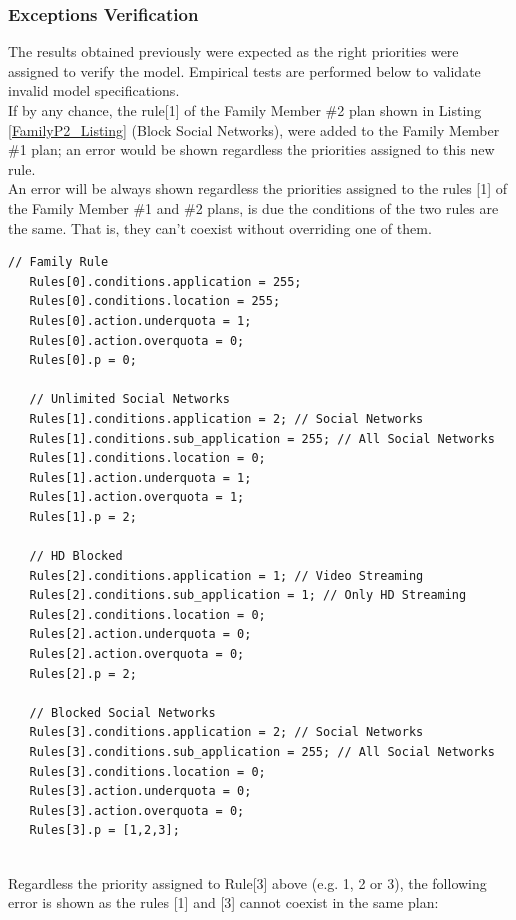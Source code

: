 \subsubsection{Exceptions Verification}
\label{sec:mutualExclusion}
\noindent The results obtained previously were expected as the right priorities were assigned to verify the model. Empirical tests are performed below to validate invalid model specifications. \\

If by any chance, the rule[1] of the Family Member \#2 plan shown in Listing \ref{FamilyP2_Listing} (Block Social Networks), were added to the Family Member \#1 plan; an error would be shown regardless the priorities assigned to this new rule. \\

An error will be always shown regardless the priorities assigned to the rules [1] of the Family Member \#1 and \#2 plans, is due the conditions of the two rules are the same. That is, they can't coexist without overriding one of them. 

\singlespacing
\begin{lstlisting}[caption=Invalidad Family Member\#1 Model,
  label=FamilyP1_Listing_error]
   // Family Rule
   Rules[0].conditions.application = 255;
   Rules[0].conditions.location = 255;
   Rules[0].action.underquota = 1;
   Rules[0].action.overquota = 0;
   Rules[0].p = 0;

   // Unlimited Social Networks
   Rules[1].conditions.application = 2; // Social Networks
   Rules[1].conditions.sub_application = 255; // All Social Networks
   Rules[1].conditions.location = 0;
   Rules[1].action.underquota = 1;
   Rules[1].action.overquota = 1;
   Rules[1].p = 2;

   // HD Blocked
   Rules[2].conditions.application = 1; // Video Streaming
   Rules[2].conditions.sub_application = 1; // Only HD Streaming
   Rules[2].conditions.location = 0;
   Rules[2].action.underquota = 0;
   Rules[2].action.overquota = 0;
   Rules[2].p = 2;
   
   // Blocked Social Networks
   Rules[3].conditions.application = 2; // Social Networks
   Rules[3].conditions.sub_application = 255; // All Social Networks
   Rules[3].conditions.location = 0;
   Rules[3].action.underquota = 0;
   Rules[3].action.overquota = 0;
   Rules[3].p = [1,2,3];
   
\end{lstlisting}
\doublespacing

Regardless the priority assigned to Rule[3] above (e.g. 1, 2 or 3), the following error is shown as the rules [1] and [3] cannot coexist in the same plan:\\


